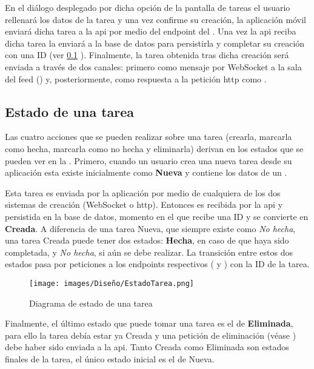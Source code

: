 En el diálogo desplegado por dicha opción de la pantalla de tareas el usuario rellenará los datos de la tarea y una vez confirme su creación, la aplicación móvil enviará dicha tarea a la \acrshort{api} por medio del \gls{endpoint} del . Una vez la \acrshort{api} reciba dicha tarea la enviará a la base de datos para persistirla y completar su creación con una ID (ver \ref{ssec:estado_tarea} ). Finalmente, la tarea obtenida tras dicha creación será enviada a través de dos canales: primero como mensaje por WebSocket a la sala del feed () y, posteriormente, como respuesta a la petición \acrshort{http} como .

\subsection{Estado de una tarea}
\label{ssec:estado_tarea}

Las cuatro acciones que se pueden realizar sobre una tarea (crearla, marcarla como hecha, marcarla como no hecha y eliminarla) derivan en los estados que se pueden ver en la . Primero, cuando un usuario crea una nueva tarea desde su aplicación esta existe inicialmente como \textbf{Nueva} y contiene los datos de un . 

Esta tarea es enviada por la aplicación por medio de cualquiera de los dos sistemas de creación (WebSocket o \acrshort{http}). Entonces es recibida por la \acrshort{api} y persistida en la base de datos, momento en el que recibe una ID y se convierte en \textbf{Creada}. A diferencia de una tarea Nueva, que siempre existe como \emph{No hecha}, una tarea Creada puede tener dos estados: \textbf{Hecha}, en caso de que haya sido completada, y \emph{No hecha}, si aún se debe realizar. La transición entre estos dos estados pasa por peticiones a los \glspl{endpoint} respectivos (  y  ) con la ID de la tarea.

\begin{figure}[H]
    \centering
    \texttt{[image: images/Diseño/EstadoTarea.png]}
    \caption{Diagrama de estado de una tarea}
    \label{dia:estado_tarea}
\end{figure}

Finalmente, el último estado que puede tomar una tarea es el de \textbf{Eliminada}, para ello la tarea debía estar ya Creada y una petición de eliminación (véase ) debe haber sido enviada a la \acrshort{api}. Tanto Creada como Eliminada son estados finales de la tarea, el único estado inicial es el de Nueva.